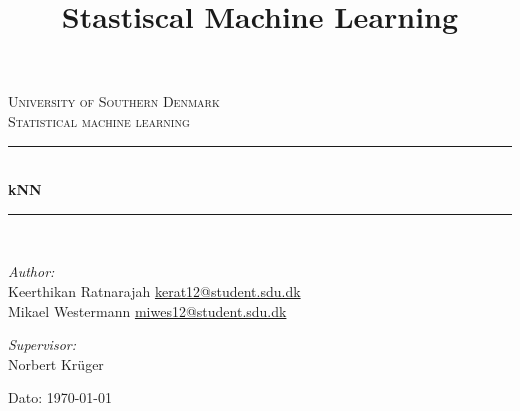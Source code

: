 \documentclass[11pt]{report}
\title{Stastiscal Machine Learning }
\begin{document}
\begin{titlepage}
\begin{center}


\textsc{\LARGE University of Southern Denmark}\\[1.5cm]
\textsc{\Large Statistical machine learning}\\[0.5cm]
\vfill
\hrule ~\\[0.3cm]
{ \huge \bfseries kNN\\[0.4cm] }
\hrule ~\\[1.5cm]
\vfill

\noindent
\begin{minipage}{0.4\textwidth}
\begin{flushleft} \large
\emph{Author:}\\
Keerthikan Ratnarajah
\url{kerat12@student.sdu.dk}\\
Mikael Westermann
\url{miwes12@student.sdu.dk}
\end{flushleft}
\end{minipage}%
\begin{minipage}{0.4\textwidth}
\begin{flushright} \large
\emph{Supervisor:}\\
Norbert Kr\"{u}ger 
\end{flushright}
\end{minipage}

\vspace{1.2cm}
Dato: \today


\end{center}
\end{titlepage}

\tableofcontents

\newpage












\end{document}
